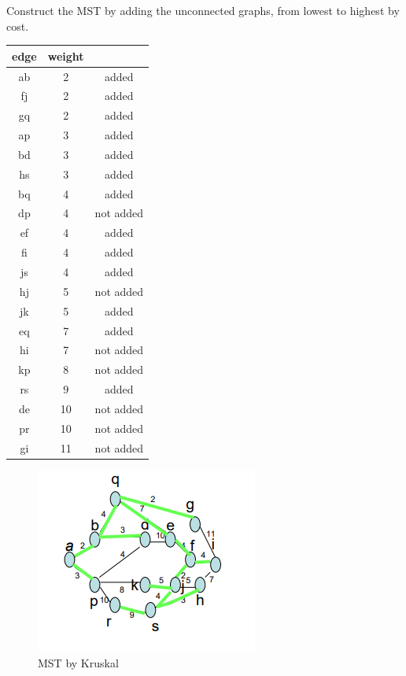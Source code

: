 \documentclass{article}
\begin{document}
\begin{enumerate}
    Construct the MST by adding the unconnected graphs, from lowest to highest by cost.

    \begin{tabular}{| c | c | c |}
        \hline
        edge & weight & \\ \hline
        ab & 2 & added \\
        fj & 2 & added \\
        gq & 2 & added  \\
        ap & 3 & added \\
        bd & 3 & added \\
        hs & 3 & added \\
        bq & 4 & added \\
        dp & 4 & not added\\
        ef & 4 & added \\
        fi & 4 & added \\
        js & 4 & added \\
        hj & 5 & not added  \\
        jk & 5 & added \\
        eq & 7 & added \\
        hi & 7 & not added \\
        kp & 8 & not added\\
        rs & 9 & added \\
        de & 10 & not added \\
        pr & 10 & not added \\
        gi & 11 & not added \\ \hline
    \end{tabular}
    \begin{figure}[ht]
        \centering
        \includegraphics{Hw8/R1.png}
        \caption{MST by Kruskal}
        \label{graph2}
    \end{figure}


\end{enumerate}
\end{document}
